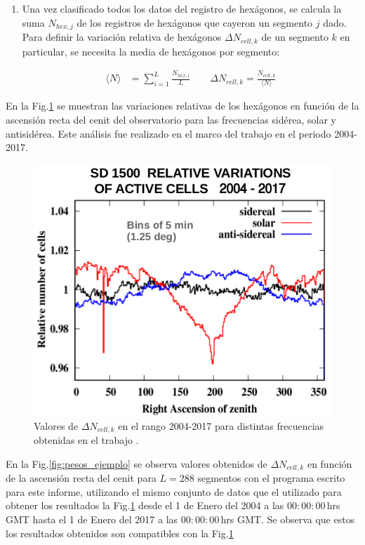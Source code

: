 \begin{enumerate}
        \item Una vez clasificado todos los datos del registro de hexágonos, se calcula la suma  $N_{hex, j}$ de los registros de hexágonos que cayeron un segmento $j$ dado. Para definir la variación relativa de hexágonos  $\Delta N_{cell,k}$ de un segmento $k$ en particular, se necesita la media de hexágonos por segmento:
       
       \begin{align}
         \langle N \rangle &= \sum^{L}_{i=1} \frac{N_{hex, i}}{L}  \qquad
         \Delta N_{cell,k} = \frac{N_{cell, k}}{\langle N \rangle}  \label{epepe}
       \end{align}

      \end{enumerate}

      En la Fig.\ref{fig:pesos_referencia} se muestran las variaciones relativas de los hexágonos en función de la ascensión recta del cenit del observatorio para las frecuencias sidérea, solar y antisidérea. Este análisis fue realizado en el marco del trabajo \cite{referencia_pesos} en el periodo 2004-2017. 

          \begin{figure}[H]
          \centering
              \includegraphics[width=0.5\linewidth]{pesos_referencia.png}  
              \caption{Valores de $\Delta N_{cell, k}$ en el rango 2004-2017 para distintas frecuencias obtenidas en el trabajo \cite{referencia_pesos}.}
              \label{fig:pesos_referencia}
        \end{figure}

       En la Fig.\ref{fig:pesos_ejemplo} se observa valores obtenidos de $\Delta N_{cell,k}$ en función de la ascensión recta del cenit  para $L=288$ segmentos con el programa escrito para este informe, utilizando el mismo conjunto de datos que el utilizado para obtener los resultados la Fig.\ref{fig:pesos_referencia} desde el 1 de Enero del 2004 a las $00:00:00\,$hrs GMT  hasta el 1 de Enero del 2017 a las $00:00:00\,$hrs GMT. Se  observa que estos los resultados obtenidos son compatibles con la Fig.\ref{fig:pesos_referencia}
 

